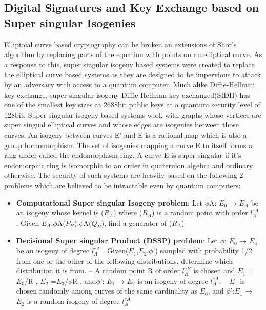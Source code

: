 \documentclass[10pt,a4paper]{article}
\begin{document}
\subsection{Digital Signatures and Key Exchange based on Super singular Isogenies}
Elliptical curve based cryptography can be broken an extensions of Shor's algorithm by replacing parts of the equation with points on an elliptical curve. As a response to this, super singular isogeny based systems were created to replace the elliptical curve based systems as they are designed to be impervious to attack by an adversary with access to a quantum computer. Much alike Diffie-Hellman key exchange, super singular isogeny Diffie-Hellman key exchanged(SIDH) has one of the smallest key sizes at 2688bit public keys at a quantum security level of 128bit.
\newline
Super singular isogeny based systems work with graphs whose vertices are super singual elliptical curves and whose edges are isogenies between those curves. An isogeny between curves E' and E is a rational map which is also a group homomorphism.
The set of isogenies mapping a curve E to itself forms a ring under called the endomorphism ring. A curve E is super singular if it's endomorphic ring is isomorphic to an order in  quaternion algebra and ordinary otherwise.
\newline
\newline
The security of such systems are heavily based on the following 2 problems which are believed to be intractable even by quantum computers:
\begin{itemize}
\item \textbf{Computational Super singular Isogeny problem}:  Let \(\phi\)A: \(E_0\) → \(E_A\) be an isogeny whose kernel is (\(R_A\))	where (\(R_A\)) is a random point with order \(l^{eA}_A\) . Given \(E_A\),\(\phi\)A(\(P_B\)),\(\phi\)A(\(Q_B\)), ﬁnd a generator of (\(R_A\))	
\item \textbf{Decisional Super singular Product (DSSP) problem}: Let \(\phi\): \(E_0\) → \(E_3\) be an isogeny of degree \(l^{eA}_A\) . Given(\(E_1\),\(E_2\),\(\phi\)') sampled with probability 1/2 from one or the other of the following distributions, determine which distribution it is from.
\subitem –  A random point R of order \(l^{eB}_B\) is chosen and \(E_1\) = \(E_0\)/{R}	, \(E_2\) =\(E_3\)/\(\phi\){R}	, and\(\phi\)': \(E_1\) → \(E_2\) is an isogeny of degree \(l^{eA}_A\).
\subitem – \(E_1\) is chosen randomly among curves of the same cardinality as \(E_0\), and \(\phi\)':\(E_1\) → \(E_2\) is a random isogeny of degree \(l^{eA}_A\)
\end{itemize} 
\end{document}
